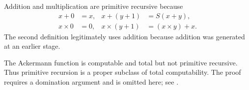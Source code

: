 \begin{example}
Addition and multiplication are primitive recursive because
\[
\begin{aligned}
  x+0&=x, & x+(y+1)&=S(x+y),\\
  x\times0&=0, & x\times(y+1)&=(x\times y)+x.
\end{aligned}
\]
The second definition legitimately uses addition because addition was
generated at an earlier stage.
\end{example}

\begin{remark}
The Ackermann function is computable and total but not primitive recursive.
Thus primitive recursion is a proper subclass of total computability.  The
proof requires a domination argument and is omitted here; see
\cite{BoolosBurgessJeffrey2007}.
\end{remark}

